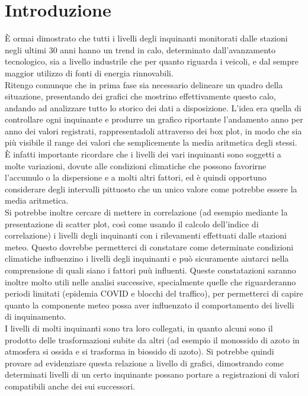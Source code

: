 \documentclass{article}
\begin{document}
\section{Introduzione}
È ormai dimostrato che tutti i livelli degli inquinanti monitorati dalle stazioni negli ultimi 30 anni hanno un trend in calo, determinato dall'avanzamento tecnologico, sia a livello industrile che per quanto riguarda i veicoli, e dal sempre maggior utilizzo di fonti di energia rinnovabili.
\\Ritengo comunque che in prima fase sia necessario delineare un quadro della situazione, presentando dei grafici che mostrino effettivamente questo calo, andando ad analizzare tutto lo storico dei dati a disposizione. L'idea era quella di controllare ogni inquinante e produrre un grafico riportante l'andamento anno per anno dei valori registrati, rappresentadoli attraverso dei box plot, in modo che sia più visibile il range dei valori che semplicemente la media aritmetica degli stessi. È infatti importante ricordare che i livelli dei vari inquinanti sono soggetti a molte variazioni, dovute alle condizioni climatiche che possono favorirne l'accumulo o la dispersione e a molti altri fattori, ed è quindi opportuno considerare degli intervalli pittuosto che un unico valore come potrebbe essere la media aritmetica.
\\Si potrebbe inoltre cercare di mettere in correlazione (ad esempio mediante la presentazione di scatter plot, così come usando il calcolo dell'indice di correlazione) i livelli degli inquinanti con i rilevamenti effettuati dalle stazioni meteo. Questo dovrebbe permetterci di constatare come determinate condizioni climatiche influenzino i livelli degli inquinanti e può sicuramente aiutarci nella comprensione di quali siano i fattori puù influenti. Queste constatazioni saranno inoltre molto utili nelle analisi successive, specialmente quelle che riguarderanno periodi limitati (epidemia COVID e blocchi del traffico), per permetterci di capire quanto la componente meteo possa aver influenzato il comportamento dei livelli di inquinamento.
\\I livelli di molti inquinanti sono tra loro collegati, in quanto alcuni sono il prodotto delle trasformazioni subite da altri (ad esempio il monossido di azoto in atmosfera si ossida e si trasforma in biossido di azoto). Si potrebbe quindi provare ad evidenziare questa relazione a livello di grafici, dimostrando come determinati livelli di un certo inquinante possano portare a registrazioni di valori compatibili anche dei sui successori.
\newpage
\end{document}
